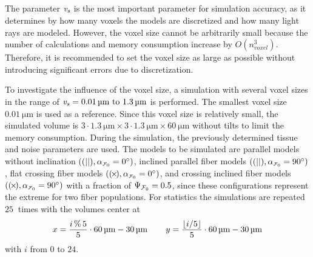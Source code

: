 \subsection{\Voxelsize{} \texorpdfstring{\voxelsize{}}{}} \label{sec:simvoxelsize}
%
The parameter \Voxelsize{} $\textnormal{$\mathit{v_{s}}$}$ is the most important parameter for simulation accuracy, as it determines by how many voxels the models are discretized and how many light rays are modeled.
However, the voxel size cannot be arbitrarily small because the number of calculations and memory consumption increase by $O(n_{\mathit{voxel}}^3)$.
Therefore, it is recommended to set the voxel size as large as possible without introducing significant errors due to discretization.
\par
%
To investigate the influence of the voxel size, a simulation with several voxel sizes in the range of $\voxelsize = \SIrange{0.01}{1.3}{\micro\meter}$ is performed.
The smallest voxel size $\SI{0.01}{\micro\meter}$ is used as a reference.
Since this voxel size is relatively small, the simulated volume is $3 \cdot \SI{1.3}{\micro\meter} \times 3 \cdot \SI{1.3}{\micro\meter} \times \SI{60}{\micro\meter}$ without tilts to limit the memory consumption.
During the simulation, the previously determined tissue and noise parameters are used.
The models to be simulated are parallel models without inclination $\left( \pfbs, \modelInc = \SI{0}{\degree} \right)$, inclined parallel fiber models $\left( \pfbs, \modelInc = \SI{90}{\degree} \right)$, flat crossing fiber models $\left( \cfbs, \modelInc = \SI{0}{\degree} \right)$, and crossing inclined fiber models $\left( \cfbs, \modelInc = \SI{90}{\degree} \right)$ with a fraction of $\textnormal{$\Psi_{\textnormal{$\mathcal{F}_0$}}$} = \SI{0.5}{}$, since these configurations represent the extreme for two fiber populations.
For statistics the simulations are repeated $\SI{25}{}$ times with the volumes center at
\begin{align}
    x=\frac{i\,\%\,5}{5} \cdot \SI{60}{\micro\meter} - \SI{30}{\micro\meter} \hspace{5ex}
    y=\frac{\lfloor i/5\rfloor}{5} \cdot \SI{60}{\micro\meter} - \SI{30}{\micro\meter}
\end{align}
with $i$ from $0$ to $24$.
%
%
%
